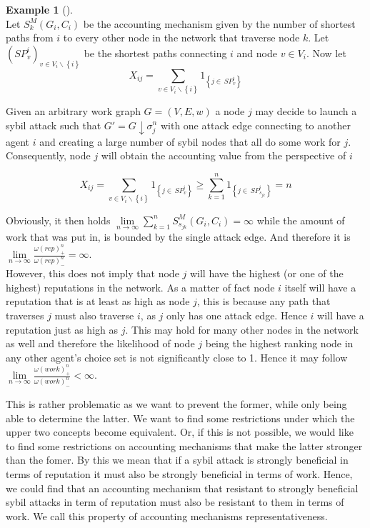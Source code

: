 \documentclass[11pt,a4paper]{report}
\theoremstyle{definition}
\theoremstyle{theorem}
\theoremstyle{proposition}
\theoremstyle{corollary}
\theoremstyle{lemma}
\theoremstyle{example}
\newtheorem{example}{Example}[section]
\theoremstyle{remark}
\begin{document}
\begin{example}[]\ \\
Let $S^M_k(G_i,C_i)$ be the accounting mechanism given by the number of shortest paths from $i$ to every other node in the network that traverse node $k$. Let $(SP^i_v)_{v\in{}V_i\backslash{}\left\lbrace{}i\right\rbrace}$ be the shortest paths connecting $i$ and node $v\in{}V_i$. Now let 
\[
X_{ij}=\sum\limits_{v\in{}V_i\backslash\left\lbrace{}i\right\rbrace}1_{\left\lbrace{}j\in{}\,SP^i_v\right\rbrace}
\]

\noindent{}Given an arbitrary work graph $G=(V,E,w)$ a node $j$ may decide to launch a sybil attack such that $G'=G\downarrow\sigma^n_j$ with one attack edge connecting to another agent $i$ and creating a large number of sybil nodes that all do some work for $j$. Consequently, node $j$ will obtain the accounting value from the perspective of $i$ 

\[
X_{ij}=\sum\limits_{v\in{}V_i\backslash\left\lbrace{}i\right\rbrace}1_{\left\lbrace{}j\in{}\,SP^i_v\right\rbrace} \geq \sum\limits_{k=1}^{n}1_{\left\lbrace{}j\in{}\,SP^i_{s_{jk}}\right\rbrace} = n
\]

\noindent{}Obviously, it then holds $\lim\limits_{n\rightarrow\infty}\sum\limits_{k=1}^{n}S^M_{s_{jk}}(G_i,C_i)=\infty$ while the amount of work that was put in, is bounded by the single attack edge. And therefore it is $\lim\limits_{n\rightarrow\infty}\frac{\omega(rep)^n_{+}}{\omega(rep)^n_{-}}=\infty.$ \vspace{1em}\\

\noindent{}However, this does not imply that node $j$ will have the highest (or one of the highest) reputations in the network. As a matter of fact node $i$ itself will have a reputation that is at least as high as node $j$, this is because any path that traverses $j$ must also traverse $i$, as $j$ only has one attack edge. Hence $i$ will have a reputation just as high as $j$. This may hold for many other nodes in the network as well and therefore the likelihood of node $j$ being the highest ranking node in any other agent's choice set is not significantly close to 1. Hence it may follow $\lim\limits_{n\rightarrow\infty}\frac{\omega(work)^n_{+}}{\omega(work)^n_{-}}<\infty$.
\end{example}

\noindent{}This is rather problematic as we want to prevent the former, while only being able to determine the latter. We want to find some restrictions under which the upper two concepts become equivalent. Or, if this is not possible, we would like to find some restrictions on accounting mechanisms that make the latter stronger than the fomer. By this we mean that if a sybil attack is strongly beneficial in terms of reputation it must also be strongly beneficial in terms of work. Hence, we could find that an accounting mechanism that resistant to strongly beneficial sybil attacks in term of reputation must also be resistant to them in terms of work. We call this property of accounting mechanisms representativeness. \vspace{1em}\\
\end{document}
